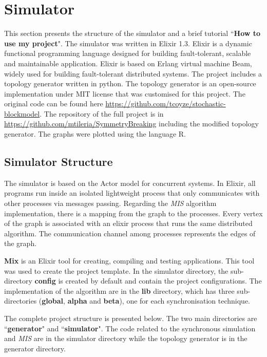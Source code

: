 \section{Simulator}
\label{chap:4}

  
This section presents the structure of the simulator and a brief tutorial ``\textbf{How to use my project}". The simulator was written in Elixir 1.3. Elixir is a dynamic functional programming language designed for building fault-tolerant, scalable and maintainable application. Elixir is based on Erlang virtual machine Beam, widely used for building fault-tolerant distributed systems. The project includes a topology generator written in python. The topology generator is an open-source implementation under MIT license that was customised for this project. The original code can be found here \url{https://github.com/tcoyze/stochastic-blockmodel}. The repository of the full project is in \url{https://github.com/mtileria/SymmetryBreaking} including the modified topology generator. The graphs were plotted using the language R.



\subsection{Simulator Structure}

The simulator is based on the Actor model for concurrent systems. In Elixir, all programs run inside an isolated lightweight process that only communicates with other processes via messages passing. Regarding the \textit{MIS} algorithm implementation, there is a mapping from the graph to the processes. Every vertex of the graph is associated with an elixir process that runs the same distributed algorithm. The communication channel among processes represents the edges of the graph. 

\textbf{Mix} is an Elixir tool for creating, compiling and testing applications. This tool was used to create the project template. In the simulator directory, the sub-directory \textbf{config} is created by default and contain the project configurations.  The implementation of the algorithm are in the \textbf{lib} directory, which has three sub-directories (\textbf{global}, \textbf{alpha} and \textbf{beta}), one for each synchronisation technique.

The complete project structure is presented below. The two main directories are ``\textbf{generator}" and ``\textbf{simulator}". The code related to the synchronous simulation and \textit{MIS} are in the simulator directory while the topology generator is in the generator directory. 


